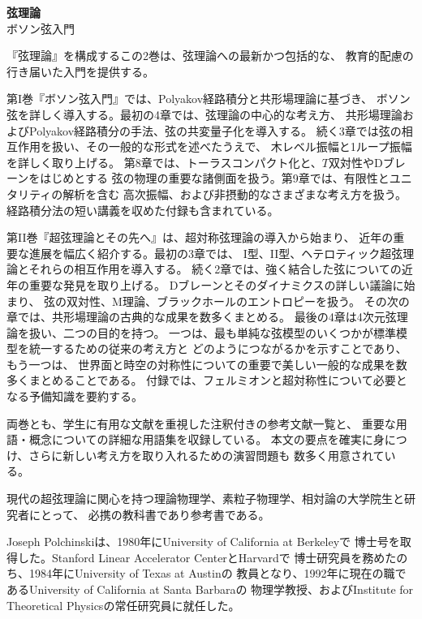 
\begin{center}
\textbf{弦理論}\\
ボソン弦入門
\end{center}

『弦理論』を構成するこの2巻は、弦理論への最新かつ包括的な、
教育的配慮の行き届いた入門を提供する。

第I巻『ボソン弦入門』では、Polyakov経路積分と共形場理論に基づき、
ボソン弦を詳しく導入する。最初の4章では、弦理論の中心的な考え方、
共形場理論およびPolyakov経路積分の手法、弦の共変量子化を導入する。
続く3章では弦の相互作用を扱い、その一般的な形式を述べたうえで、
木レベル振幅と1ループ振幅を詳しく取り上げる。
第8章では、トーラスコンパクト化と、$T$双対性やDブレーンをはじめとする
弦の物理の重要な諸側面を扱う。第9章では、有限性とユニタリティの解析を含む
高次振幅、および非摂動的なさまざまな考え方を扱う。
経路積分法の短い講義を収めた付録も含まれている。

第II巻『超弦理論とその先へ』は、超対称弦理論の導入から始まり、
近年の重要な進展を幅広く紹介する。最初の3章では、
I型、II型、ヘテロティック超弦理論とそれらの相互作用を導入する。
続く2章では、強く結合した弦についての近年の重要な発見を取り上げる。
Dブレーンとそのダイナミクスの詳しい議論に始まり、
弦の双対性、M理論、ブラックホールのエントロピーを扱う。
その次の章では、共形場理論の古典的な成果を数多くまとめる。
最後の4章は4次元弦理論を扱い、二つの目的を持つ。
一つは、最も単純な弦模型のいくつかが標準模型を統一するための従来の考え方と
どのようにつながるかを示すことであり、もう一つは、
世界面と時空の対称性についての重要で美しい一般的な成果を数多くまとめることである。
付録では、フェルミオンと超対称性について必要となる予備知識を要約する。

両巻とも、学生に有用な文献を重視した注釈付きの参考文献一覧と、
重要な用語・概念についての詳細な用語集を収録している。
本文の要点を確実に身につけ、さらに新しい考え方を取り入れるための演習問題も
数多く用意されている。

現代の超弦理論に関心を持つ理論物理学、素粒子物理学、相対論の大学院生と研究者にとって、
必携の教科書であり参考書である。

Joseph Polchinskiは、1980年にUniversity of California at Berkeleyで
博士号を取得した。Stanford Linear Accelerator CenterとHarvardで
博士研究員を務めたのち、1984年にUniversity of Texas at Austinの
教員となり、1992年に現在の職であるUniversity of California at Santa Barbaraの
物理学教授、およびInstitute for Theoretical Physicsの常任研究員に就任した。

